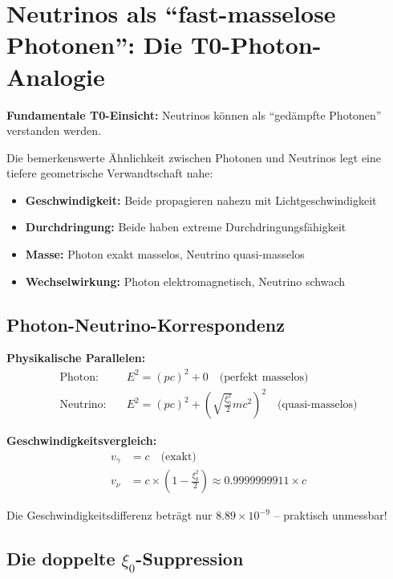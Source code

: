\documentclass[12pt,a4paper]{article}
\newcommand{\xipar}{\xi_0}
\begin{document}
	\section{Neutrinos als ``fast-masselose Photonen'': Die T0-Photon-Analogie}
	
	\begin{speculation}
		\textbf{Fundamentale T0-Einsicht:} Neutrinos können als ``gedämpfte Photonen'' verstanden werden.
		
		Die bemerkenswerte Ähnlichkeit zwischen Photonen und Neutrinos legt eine tiefere geometrische Verwandtschaft nahe:
		\begin{itemize}
			\item \textbf{Geschwindigkeit:} Beide propagieren nahezu mit Lichtgeschwindigkeit
			\item \textbf{Durchdringung:} Beide haben extreme Durchdringungsfähigkeit
			\item \textbf{Masse:} Photon exakt masselos, Neutrino quasi-masselos
			\item \textbf{Wechselwirkung:} Photon elektromagnetisch, Neutrino schwach
		\end{itemize}
	\end{speculation}
	
	\subsection{Photon-Neutrino-Korrespondenz}
	
	\begin{photon}
		\textbf{Physikalische Parallelen:}
		\begin{align}
			\text{Photon:} \quad &E^2 = (pc)^2 + 0 \quad \text{(perfekt masselos)} \\
			\text{Neutrino:} \quad &E^2 = (pc)^2 + \left(\sqrt{\frac{\xipar^2}{2}} m c^2\right)^2 \quad \text{(quasi-masselos)}
		\end{align}
		
		\textbf{Geschwindigkeitsvergleich:}
		\begin{align}
			v_\gamma &= c \quad \text{(exakt)} \\
			v_\nu &= c \times \left(1 - \frac{\xipar^2}{2}\right) \approx 0.9999999911 \times c
		\end{align}
		
		Die Geschwindigkeitsdifferenz beträgt nur $8.89 \times 10^{-9}$ -- praktisch unmessbar!
	\end{photon}
	
	\subsection{Die doppelte $\xi_0$-Suppression}
	
\end{document}
